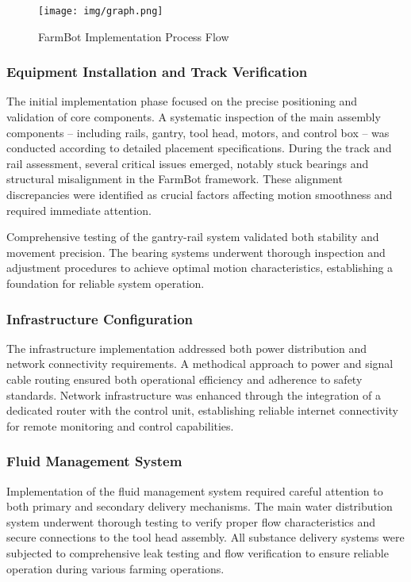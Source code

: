 \begin{figure}[h]
    \centering
    \texttt{[image: img/graph.png]}
    \caption{FarmBot Implementation Process Flow}
    \label{fig:implementation-flow}
\end{figure}

\subsubsection{Equipment Installation and Track Verification}
The initial implementation phase focused on the precise positioning and validation of core components. A systematic inspection of the main assembly components -- including rails, gantry, tool head, motors, and control box -- was conducted according to detailed placement specifications. During the track and rail assessment, several critical issues emerged, notably stuck bearings and structural misalignment in the FarmBot framework. These alignment discrepancies were identified as crucial factors affecting motion smoothness and required immediate attention.

Comprehensive testing of the gantry-rail system validated both stability and movement precision. The bearing systems underwent thorough inspection and adjustment procedures to achieve optimal motion characteristics, establishing a foundation for reliable system operation.

\subsubsection{Infrastructure Configuration}
The infrastructure implementation addressed both power distribution and network connectivity requirements. A methodical approach to power and signal cable routing ensured both operational efficiency and adherence to safety standards. Network infrastructure was enhanced through the integration of a dedicated router with the control unit, establishing reliable internet connectivity for remote monitoring and control capabilities.

\subsubsection{Fluid Management System}
Implementation of the fluid management system required careful attention to both primary and secondary delivery mechanisms. The main water distribution system underwent thorough testing to verify proper flow characteristics and secure connections to the tool head assembly. All substance delivery systems were subjected to comprehensive leak testing and flow verification to ensure reliable operation during various farming operations.

